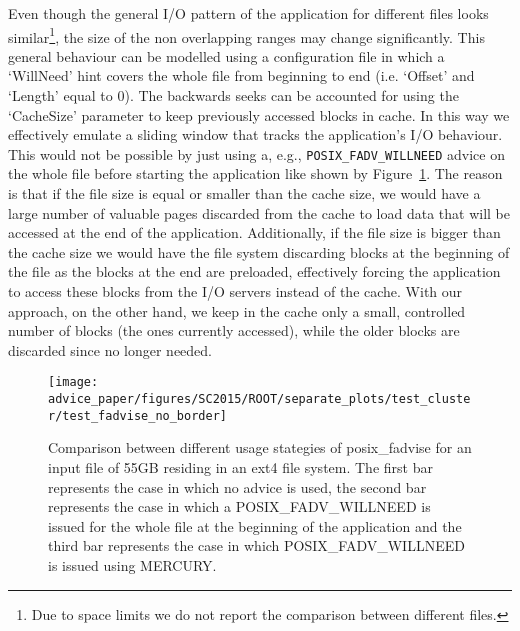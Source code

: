 Even though the general I/O pattern of the application for different files looks similar\footnote{Due to space limits we do not report the comparison between different files.}, the size of the non overlapping ranges may change significantly. This general behaviour can be modelled using a configuration file in which a `WillNeed' hint covers the whole file from beginning to end (i.e. `Offset' and `Length' equal to 0). The backwards seeks can be accounted for using the `CacheSize' parameter to keep previously accessed blocks in cache. In this way we effectively emulate a sliding window that tracks the application's I/O behaviour. This would not be possible by just using a, e.g., \texttt{POSIX\_FADV\_WILLNEED} advice on the whole file before starting the application like shown by Figure~\ref{figure: fadvise_comparison}. The reason is that if the file size is equal or smaller than the cache size, we would have a large number of valuable pages discarded from the cache to load data that will be accessed at the end of the application. Additionally, if the file size is bigger than the cache size we would have the file system discarding blocks at the beginning of the file as the blocks at the end are preloaded, effectively forcing the application to access these blocks from the I/O servers instead of the cache. With our approach, on the other hand, we keep in the cache only a small, controlled number of blocks (the ones currently accessed), while the older blocks are discarded since no longer needed. %

\begin{figure}[!htb]
  \centering
  \texttt{[image: advice\_paper/figures/SC2015/ROOT/separate\_plots/test\_cluster/test\_fadvise\_no\_border]}
  \caption{Comparison between different usage stategies of posix\_fadvise for an input file of 55GB residing in an ext4 file system. The first bar represents the case in which no advice is used, the second bar represents the case in which a POSIX\_FADV\_WILLNEED is issued for the whole file at the beginning of the application and the third bar represents the case in which POSIX\_FADV\_WILLNEED is issued using MERCURY.}
  \label{figure: fadvise_comparison}
\end{figure} 
 
